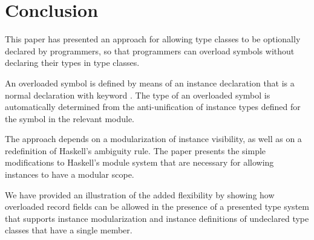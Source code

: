 \section{Conclusion}
\label{sec:conclusion}

This paper has presented an approach for allowing type classes to be
optionally declared by programmers, so that programmers can overload
symbols without declaring their types in type classes. 

An overloaded symbol is defined by means of an instance declaration
that is a normal declaration with keyword \instance. The type of an
overloaded symbol is automatically determined from the
anti-unification of instance types defined for the symbol in the
relevant module.

The approach depends on a modularization of instance visibility, as
well as on a redefinition of Haskell's ambiguity rule. The paper
presents the simple modifications to Haskell's module system that are
necessary for allowing instances to have a modular scope.

We have provided an illustration of the added flexibility by showing
how overloaded record fields can be allowed in the presence of a
presented type system that supports instance modularization and
instance definitions of undeclared type classes that have a single
member.

